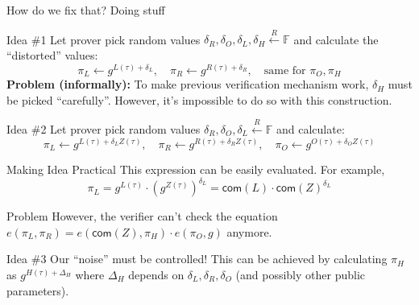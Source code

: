 \documentclass{zkdl-presentation-template}
\begin{document}
    \begin{frame}{How do we fix that? Doing stuff}
        \begin{block}{Idea \#1}
            Let prover pick random values $\delta_R, \delta_O, \delta_L, \delta_H \xleftarrow{R} \mathbb{F}$ and calculate the ``distorted'' values:
            \begin{equation*}
                \pi_L \gets g^{L(\tau) + \delta_L}, \quad \pi_R \gets g^{R(\tau) + \delta_R}, \quad \text{same for $\pi_O, \pi_H$}
            \end{equation*}
            \textbf{Problem (informally):} To make previous verification mechanism work, $\delta_H$ must be picked ``carefully''. However, it's impossible to do so with this construction.
        \end{block}

        \begin{block}{Idea \#2}
            Let prover pick random values $\delta_R, \delta_O, \delta_L \xleftarrow{R} \mathbb{F}$ and calculate:
            \begin{equation*}
                \pi_L \gets g^{L(\tau) + \delta_L Z(\tau)}, \quad \pi_R \gets g^{R(\tau) + \delta_R Z(\tau)}, \quad \pi_O \gets g^{O(\tau) + \delta_O Z(\tau)}
            \end{equation*}
        \end{block}
    \end{frame}

    \begin{frame}{Making Idea Practical}
        This expression can be easily evaluated. For example,
        \begin{equation*}
            \pi_L = g^{L(\tau)} \cdot \left(g^{Z(\tau)}\right)^{\delta_L} = \mathsf{com}(L) \cdot \mathsf{com}(Z)^{\delta_L}
        \end{equation*}

        \begin{alertblock}{Problem}
            However, the verifier can't check the equation $e(\pi_L, \pi_R) = e(\mathsf{com}(Z), \pi_H) \cdot e(\pi_O, g)$ anymore. 
        \end{alertblock}

        \begin{block}{Idea \#3}
            Our ``noise'' must be controlled! This can be achieved by calculating $\pi_H$ as $g^{H(\tau) + \Delta_H}$ where $\Delta_H$ depends on $\delta_L, \delta_R, \delta_O$ (and possibly other public parameters).    
        \end{block}
    \end{frame}
\end{document}
